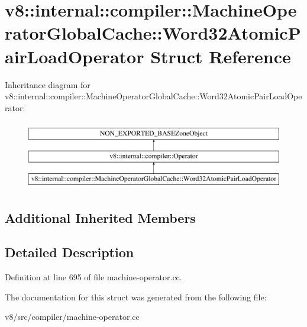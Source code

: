 \hypertarget{structv8_1_1internal_1_1compiler_1_1MachineOperatorGlobalCache_1_1Word32AtomicPairLoadOperator}{}\section{v8\+:\+:internal\+:\+:compiler\+:\+:Machine\+Operator\+Global\+Cache\+:\+:Word32\+Atomic\+Pair\+Load\+Operator Struct Reference}
\label{structv8_1_1internal_1_1compiler_1_1MachineOperatorGlobalCache_1_1Word32AtomicPairLoadOperator}
Inheritance diagram for v8\+:\+:internal\+:\+:compiler\+:\+:Machine\+Operator\+Global\+Cache\+:\+:Word32\+Atomic\+Pair\+Load\+Operator\+:\begin{figure}[H]
\begin{center}
\leavevmode
\includegraphics[height=3.000000cm]{structv8_1_1internal_1_1compiler_1_1MachineOperatorGlobalCache_1_1Word32AtomicPairLoadOperator}
\end{center}
\end{figure}
\subsection*{Additional Inherited Members}


\subsection{Detailed Description}


Definition at line 695 of file machine-\/operator.\+cc.



The documentation for this struct was generated from the following file\+:\begin{DoxyCompactItemize}
\item 
v8/src/compiler/machine-\/operator.\+cc\end{DoxyCompactItemize}
